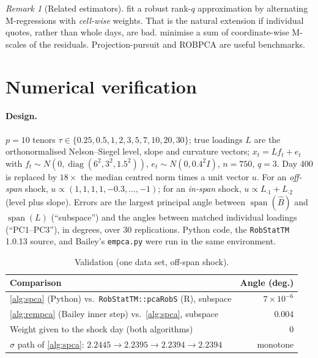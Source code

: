 \documentclass[11pt]{article}
\theoremstyle{definition}
\theoremstyle{remark}
\newtheorem{remark}[theorem]{Remark}
\DeclareMathOperator{\spn}{span}
\begin{document}
\begin{remark}[Related estimators]
\citet{MaronnaYohai2008} fit a robust rank-$q$ approximation by alternating M-regressions with \emph{cell-wise} weights.
That is the natural extension if individual quotes, rather than whole days, are bad. \citet{BoenteSalibian2015} minimise a sum
of coordinate-wise M-scales of the residuals. Projection-pursuit \citep{CrouxRuizGazen2005} and ROBPCA \citep{HubertEtAl2005}
are useful benchmarks.
\end{remark}

\section{Numerical verification}\label{sec:numerics}

\paragraph{Design.} $p=10$ tenors $\tau\in\{0.25,0.5,1,2,3,5,7,10,20,30\}$; true loadings $L$ are the orthonormalised
Nelson--Siegel level, slope and curvature vectors; $x_t=Lf_t+e_t$ with $f_t\sim N(0,\operatorname{diag}(6^2,3^2,1.5^2))$,
$e_t\sim N(0,0.4^2I)$, $n=750$, $q=3$. Day 400 is replaced by $18\times$ the median centred norm times a unit vector $u$.
For an \emph{off-span} shock, $u\propto(1,1,1,1,-0.3,\dots,-1)$; for an \emph{in-span} shock, $u\propto L_{\cdot1}+L_{\cdot2}$ (level plus
slope). Errors are the largest principal angle between $\spn(\hat B)$ and $\spn(L)$ (``subspace'') and the angles between
matched individual loadings (``PC1--PC3''), in degrees, over 30 replications. Python code, the \texttt{RobStatTM} 1.0.13
source, and Bailey's \texttt{empca.py} were run in the same environment.

\begin{table}[ht]\centering
\caption{Validation (one data set, off-span shock).}\label{tab:valid}
\begin{tabular}{lr}\toprule
Comparison & Angle (deg.)\\\midrule
\cref{alg:spca} (Python) vs.\ \texttt{RobStatTM::pcaRobS} (R), subspace & $7\times10^{-6}$\\
\cref{alg:rempca} (Bailey inner step) vs.\ \cref{alg:spca}, subspace & $0.004$\\
Weight given to the shock day (both algorithms) & $0$\\
$\sigma$ path of \cref{alg:spca}: $2.2445\to2.2395\to2.2394\to2.2394$ & monotone\\\bottomrule
\end{tabular}
\end{table}
\end{document}
